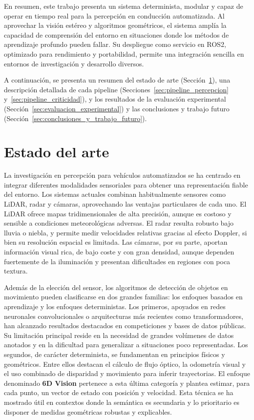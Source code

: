 En resumen, este trabajo presenta un sistema determinista, modular y capaz de
operar en tiempo real para la percepción en conducción automatizada. Al
aprovechar la visión estéreo y algoritmos geométricos, el sistema amplía la
capacidad de comprensión del entorno en situaciones donde los métodos de
aprendizaje profundo pueden fallar. Su despliegue como servicio en ROS2,
optimizado para rendimiento y portabilidad, permite una integración sencilla en
entornos de investigación y desarrollo diversos.

A continuación, se presenta un resumen del estado de arte (Sección~\ref{sec:estado_del_arte}), 
una descripción detallada de cada pipeline (Secciones~\ref{sec:pipeline_percepcion} y~\ref{sec:pipeline_criticidad}), 
y los resultados de la evaluación experimental (Sección~\ref{sec:evaluacion_experimental}) y las conclusiones y trabajo futuro (Sección~\ref{sec:conclusiones_y_trabajo_futuro}).


\section{Estado del arte}
\label{sec:estado_del_arte}

La investigación en percepción para vehículos automatizados se ha centrado en
integrar diferentes modalidades sensoriales para obtener una representación
fiable del entorno. Los sistemas actuales combinan habitualmente sensores como
LiDAR, radar y cámaras, aprovechando las ventajas particulares de cada uno. El
LiDAR ofrece mapas tridimensionales de alta precisión, aunque es costoso y
sensible a condiciones meteorológicas adversas. El radar resulta robusto bajo
lluvia o niebla, y permite medir velocidades relativas gracias al efecto
Doppler, si bien su resolución espacial es limitada. Las cámaras, por su parte,
aportan información visual rica, de bajo coste y con gran densidad, aunque
dependen fuertemente de la iluminación y presentan dificultades en regiones con
poca textura.

Además de la elección del sensor, los algoritmos de detección de objetos en
movimiento pueden clasificarse en dos grandes familias: los enfoques basados en
aprendizaje y los enfoques deterministas. Los primeros, apoyados en redes
neuronales convolucionales o arquitecturas más recientes como transformadores,
han alcanzado resultados destacados en competiciones y bases de datos públicas.
Su limitación principal reside en la necesidad de grandes volúmenes de datos
anotados y en la dificultad para generalizar a situaciones poco representadas.
Los segundos, de carácter determinista, se fundamentan en principios físicos y
geométricos. Entre ellos destacan el cálculo de flujo óptico, la odometría
visual y el uso combinado de disparidad y movimiento para inferir trayectorias.
El enfoque denominado \textbf{6D Vision} \cite{6d_vision_daimler} pertenece a
esta última categoría y plantea estimar, para cada punto, un vector de estado
con posición y velocidad. Esta técnica se ha mostrado útil en contextos donde
la semántica es secundaria y lo prioritario es disponer de medidas geométricas
robustas y explicables.


